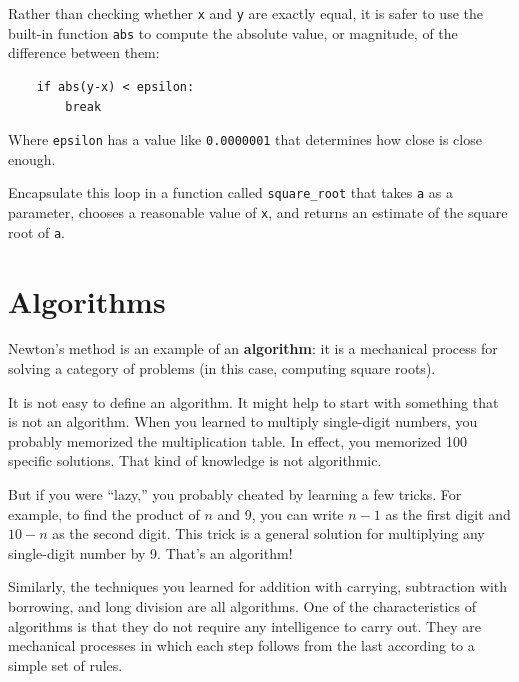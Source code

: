 \documentclass[10pt]{book}
\begin{document}

Rather than checking whether {\tt x} and {\tt y} are exactly equal, it
is safer to use the built-in function {\tt abs} to compute the
absolute value, or magnitude, of the difference between them:

\beforeverb
\begin{verbatim}
    if abs(y-x) < epsilon:
        break
\end{verbatim}
\afterverb
%
Where \verb"epsilon" has a value like {\tt 0.0000001} that
determines how close is close enough.

\begin{ex}
\label{square_root}

Encapsulate this loop in a function called \verb"square_root"
that takes {\tt a} as a parameter, chooses a reasonable
value of {\tt x}, and returns an estimate of the square root
of {\tt a}.
\end{ex}


\section{Algorithms}

Newton's method is an example of an {\bf algorithm}: it is a
mechanical process for solving a category of problems (in this
case, computing square roots).

It is not easy to define an algorithm.  It might help to start
with something that is not an algorithm.  When you learned
to multiply single-digit numbers, you probably memorized the
multiplication table.  In effect, you memorized 100 specific solutions.
That kind of knowledge is not algorithmic.

But if you were ``lazy,'' you probably cheated by learning a few
tricks.  For example, to find the product of $n$ and 9, you can
write $n-1$ as the first digit and $10-n$ as the second
digit.  This trick is a general solution for multiplying any
single-digit number by 9.  That's an algorithm!


Similarly, the techniques you learned for addition with carrying,
subtraction with borrowing, and long division are all algorithms.  One
of the characteristics of algorithms is that they do not require any
intelligence to carry out.  They are mechanical processes in which
each step follows from the last according to a simple set of rules.
\end{document}
